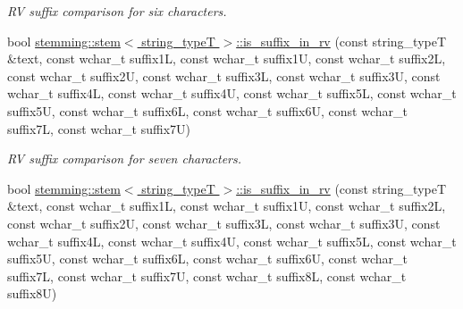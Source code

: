 \begin{DoxyCompactItemize}
\begin{DoxyCompactList}\small\item\em R\-V suffix comparison for six characters. \end{DoxyCompactList}\item 
\hypertarget{group___stemming_gabd6431b54fc5175c29809c627c44a587}{bool \hyperlink{group___stemming_gabd6431b54fc5175c29809c627c44a587}{stemming\-::stem$<$ string\-\_\-type\-T $>$\-::is\-\_\-suffix\-\_\-in\-\_\-rv} (const string\-\_\-type\-T \&text, const wchar\-\_\-t suffix1\-L, const wchar\-\_\-t suffix1\-U, const wchar\-\_\-t suffix2\-L, const wchar\-\_\-t suffix2\-U, const wchar\-\_\-t suffix3\-L, const wchar\-\_\-t suffix3\-U, const wchar\-\_\-t suffix4\-L, const wchar\-\_\-t suffix4\-U, const wchar\-\_\-t suffix5\-L, const wchar\-\_\-t suffix5\-U, const wchar\-\_\-t suffix6\-L, const wchar\-\_\-t suffix6\-U, const wchar\-\_\-t suffix7\-L, const wchar\-\_\-t suffix7\-U)}\label{group___stemming_gabd6431b54fc5175c29809c627c44a587}

\begin{DoxyCompactList}\small\item\em R\-V suffix comparison for seven characters. \end{DoxyCompactList}\item 
\hypertarget{group___stemming_ga553b6ed34e6b03e2c1ca42ea2db08ba6}{bool \hyperlink{group___stemming_ga553b6ed34e6b03e2c1ca42ea2db08ba6}{stemming\-::stem$<$ string\-\_\-type\-T $>$\-::is\-\_\-suffix\-\_\-in\-\_\-rv} (const string\-\_\-type\-T \&text, const wchar\-\_\-t suffix1\-L, const wchar\-\_\-t suffix1\-U, const wchar\-\_\-t suffix2\-L, const wchar\-\_\-t suffix2\-U, const wchar\-\_\-t suffix3\-L, const wchar\-\_\-t suffix3\-U, const wchar\-\_\-t suffix4\-L, const wchar\-\_\-t suffix4\-U, const wchar\-\_\-t suffix5\-L, const wchar\-\_\-t suffix5\-U, const wchar\-\_\-t suffix6\-L, const wchar\-\_\-t suffix6\-U, const wchar\-\_\-t suffix7\-L, const wchar\-\_\-t suffix7\-U, const wchar\-\_\-t suffix8\-L, const wchar\-\_\-t suffix8\-U)}\label{group___stemming_ga553b6ed34e6b03e2c1ca42ea2db08ba6}


\end{DoxyCompactItemize}
